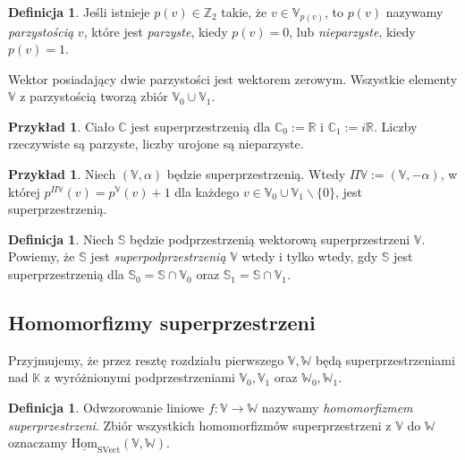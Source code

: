 \documentclass[11pt,a4paper]{report}
\theoremstyle{definition}
\newtheorem{example}[theorem]{Przykład}
\newtheorem{definition}[theorem]{Definicja}
\begin{document}
\begin{definition}
Jeśli istnieje $p(v) \in \mathbb{Z}_2$ takie, że $v \in \mathbb{V}_{p(v)}$, to $p(v)$ nazywamy \textit{parzystością} $v$, które jest \textit{parzyste}, kiedy $p(v) = 0$, lub \textit{nieparzyste}, kiedy $p(v) = 1$.
\end{definition}

Wektor posiadający dwie parzystości jest wektorem zerowym. Wszystkie elementy $\mathbb{V}$ z parzystością tworzą zbiór $\mathbb{V}_0 \cup \mathbb{V}_1$.

\begin{example}
Ciało $\mathbb{C}$ jest superprzestrzenią dla $\mathbb{C}_0 := \mathbb{R}$ i $\mathbb{C}_1 := i\mathbb{R}$. Liczby rzeczywiste są parzyste, liczby urojone są nieparzyste.
\end{example}

\begin{example}
\label{ex:parity_exchange}
Niech $(\mathbb{V}, \alpha)$ będzie superprzestrzenią. Wtedy $\Pi \mathbb{V} := (\mathbb{V}, -\alpha)$, w której $p^{\Pi \mathbb{V}}(v) = p^\mathbb{V}(v) + 1$ dla każdego $v \in \mathbb{V}_0 \cup \mathbb{V}_1 \backslash \{ 0 \}$, jest superprzestrzenią.
\end{example}

\begin{definition}
\label{def:supersubspace}
 Niech $\mathbb{S}$ będzie podprzestrzenią wektorową superprzestrzeni $\mathbb{V}$. Powiemy, że $\mathbb{S}$ jest \textit{superpodprzestrzenią} $\mathbb{V}$ wtedy i tylko wtedy, gdy $\mathbb{S}$ jest superprzestrzenią dla $\mathbb{S}_0 = \mathbb{S} \cap \mathbb{V}_0$ oraz $\mathbb{S}_1 = \mathbb{S} \cap \mathbb{V}_1$.
\end{definition}

\subsection{Homomorfizmy superprzestrzeni}

Przyjmujemy, że przez resztę rozdziału pierwszego $\mathbb{V},\mathbb{W}$ będą superprzestrzeniami nad $\mathbb{K}$ z wyróżnionymi podprzestrzeniami $\mathbb{V}_0, \mathbb{V}_1$ oraz $\mathbb{W}_{0}, \mathbb{W}_1$.

\begin{definition}
Odwzorowanie liniowe $f: \mathbb{V} \rightarrow \mathbb{W}$ nazywamy \textit{homomorfizmem superprzestrzeni}. Zbiór wszystkich homomorfizmów superprzestrzeni z $\mathbb{V}$ do $\mathbb{W}$ oznaczamy $\underline{\mathrm{Hom}}_{\mathrm{SVect}}(\mathbb{V},\mathbb{W})$.
\end{definition}
\end{document}
